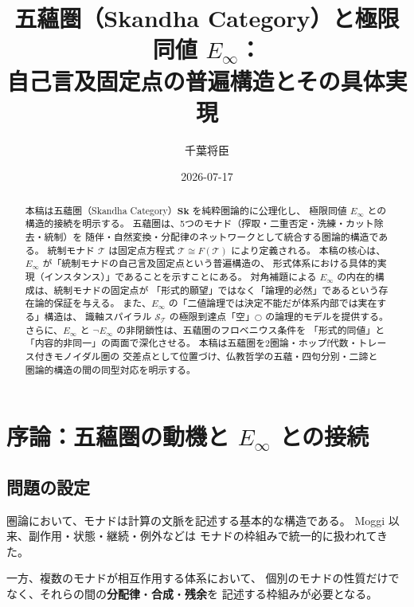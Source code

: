 \documentclass[11pt,a4paper]{article}
\theoremstyle{definition}
\newcommand{\Sk}{\mathbf{Sk}}
\newcommand{\T}{\mathcal{T}}
\newcommand{\SpiralT}{\mathcal{S}_{\mathcal{T}}}
\newcommand{\Einf}{E_{\infty}}
\begin{document}
\title{五蘊圏（Skandha Category）と極限同値 $E_{\infty}$：\\
自己言及固定点の普遍構造とその具体実現}
\author{千葉将臣}
\date{2026-07-17}
\maketitle

\begin{abstract}
本稿は五蘊圏（Skandha Category）$\Sk$ を純粋圏論的に公理化し、
極限同値 $\Einf$ との構造的接続を明示する。
五蘊圏は、5つのモナド（搾取・二重否定・洗練・カット除去・統制）を
随伴・自然変換・分配律のネットワークとして統合する圏論的構造である。
統制モナド $\T$ は固定点方程式 $\T \cong F(\T)$ により定義される。
本稿の核心は、$\Einf$ が「統制モナドの自己言及固定点という普遍構造の、
形式体系における具体的実現（インスタンス）」であることを示すことにある。
対角補題による $\Einf$ の内在的構成は、統制モナドの固定点が
「形式的願望」ではなく「論理的必然」であるという存在論的保証を与える。
また、$\Einf$ の「二値論理では決定不能だが体系内部では実在する」構造は、
識軸スパイラル $\SpiralT$ の極限到達点「空」$\bigcirc$ の論理的モデルを提供する。
さらに、$\Einf$ と $\neg\Einf$ の非閉鎖性は、五蘊圏のフロベニウス条件を
「形式的同値」と「内容的非同一」の両面で深化させる。
本稿は五蘊圏を2圏論・ホップf代数・トレース付きモノイダル圏の
交差点として位置づけ、仏教哲学の五蘊・四句分別・二諦と
圏論的構造の間の同型対応を明示する。
\end{abstract}

\tableofcontents
\newpage

\section{序論：五蘊圏の動機と $E_{\infty}$ との接続}

\subsection{問題の設定}

圏論において、モナドは計算の文脈を記述する基本的な構造である。
Moggi \cite{Moggi1991} 以来、副作用・状態・継続・例外などは
モナドの枠組みで統一的に扱われてきた。

一方、複数のモナドが相互作用する体系において、
個別のモナドの性質だけでなく、それらの間の\textbf{分配律}・\textbf{合成}・\textbf{残余}を
記述する枠組みが必要となる。
\end{document}
